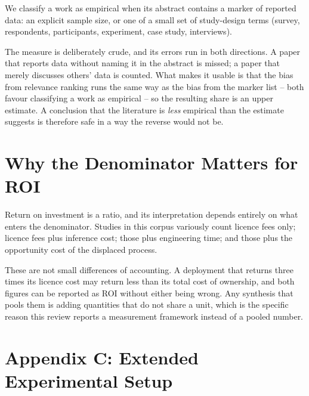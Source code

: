 \documentclass[10pt,journal,compsoc,twocolumn]{IEEEtran}
\begin{document}
We classify a work as empirical when its abstract contains a marker of reported data: an explicit sample size, or one of a small set of study-design terms (survey, respondents, participants, experiment, case study, interviews).

The measure is deliberately crude, and its errors run in both directions. A paper that reports data without naming it in the abstract is missed; a paper that merely discusses others' data is counted. What makes it usable is that the bias from relevance ranking runs the same way as the bias from the marker list -- both favour classifying a work as empirical -- so the resulting share is an upper estimate. A conclusion that the literature is \textit{less} empirical than the estimate suggests is therefore safe in a way the reverse would not be.


\section{Why the Denominator Matters for ROI}


Return on investment is a ratio, and its interpretation depends entirely on what enters the denominator. Studies in this corpus variously count licence fees only; licence fees plus inference cost; those plus engineering time; and those plus the opportunity cost of the displaced process.

These are not small differences of accounting. A deployment that returns three times its licence cost may return less than its total cost of ownership, and both figures can be reported as ROI without either being wrong. Any synthesis that pools them is adding quantities that do not share a unit, which is the specific reason this review reports a measurement framework instead of a pooled number.




\section{Appendix C: Extended Experimental Setup}
\end{document}
